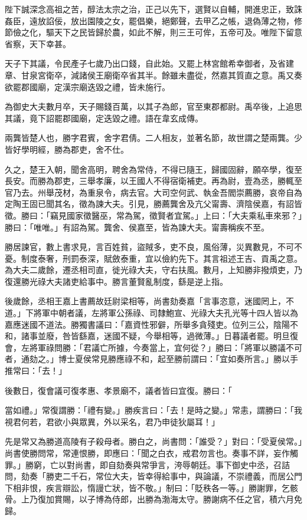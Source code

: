 \begin{pinyinscope}
陛下誠深念高祖之苦，醇法太宗之治，正己以先下，選賢以自輔，開進忠正，致誅姦臣，遠放諂佞，放出園陵之女，罷倡樂，絕鄭聲，去甲乙之帳，退偽薄之物，修節儉之化，驅天下之民皆歸於農，如此不解，則三王可侔，五帝可及。唯陛下留意省察，天下幸甚。

天子下其議，令民產子七歲乃出口錢，自此始。又罷上林宮館希幸御者，及省建章、甘泉宮衛卒，減諸侯王廟衛卒省其半。餘雖未盡從，然嘉其質直之意。禹又奏欲罷郡國廟，定漢宗廟迭毀之禮，皆未施行。

為御史大夫數月卒，天子賜錢百萬，以其子為郎，官至東郡都尉。禹卒後，上追思其議，竟下詔罷郡國廟，定迭毀之禮。語在韋玄成傳。

兩龔皆楚人也，勝字君賓，舍字君倩。二人相友，並著名節，故世謂之楚兩龔。少皆好學明經，勝為郡吏，舍不仕。

久之，楚王入朝，聞舍高明，聘舍為常侍，不得已隨王，歸國固辭，願卒學，復至長安。而勝為郡吏，三舉孝廉，以王國人不得宿衛補吏。再為尉，壹為丞，勝輒至官乃去。州舉茂材，為重泉令，病去官。大司空何武、執金吾閻崇薦勝，哀帝自為定陶王固已聞其名，徵為諫大夫。引見，勝薦龔舍及亢父甯壽、濟陰侯嘉，有詔皆徵。勝曰：「竊見國家徵醫巫，常為駕，徵賢者宜駕。」上曰：「大夫乘私車來邪？」勝曰：「唯唯。」有詔為駕。龔舍、侯嘉至，皆為諫大夫。甯壽稱疾不至。

勝居諫官，數上書求見，言百姓貧，盜賊多，吏不良，風俗薄，災異數見，不可不憂。制度泰奢，刑罰泰深，賦斂泰重，宜以儉約先下。其言祖述王吉、貢禹之意。為大夫二歲餘，遷丞相司直，徙光祿大夫，守右扶風。數月，上知勝非撥煩吏，乃復還勝光祿大夫諸吏給事中。勝言董賢亂制度，繇是逆上指。

後歲餘，丞相王嘉上書薦故廷尉梁相等，尚書劾奏嘉「言事恣意，迷國罔上，不道。」下將軍中朝者議，左將軍公孫祿、司隸鮑宣、光祿大夫孔光等十四人皆以為嘉應迷國不道法。勝獨書議曰：「嘉資性邪僻，所舉多貪殘吏。位列三公，陰陽不和，諸事並廢，咎皆繇嘉，迷國不疑，今舉相等，過微薄。」日暮議者罷。明旦復會，左將軍祿問勝：「君議亡所據，今奏當上，宜何從？」勝曰：「將軍以勝議不可者，通劾之。」博士夏侯常見勝應祿不和，起至勝前謂曰：「宜如奏所言。」勝以手推常曰：「去！」

後數日，復會議可復孝惠、孝景廟不，議者皆曰宜復。勝曰：「

當如禮。」常復謂勝：「禮有變。」勝疾言曰：「去！是時之變。」常恚，謂勝曰：「我視君何若，君欲小與眾異，外以采名，君乃申徒狄屬耳！」

先是常又為勝道高陵有子殺母者。勝白之，尚書問：「誰受？」對曰：「受夏侯常。」尚書使勝問常，常連恨勝，即應曰：「聞之白衣，戒君勿言也。奏事不詳，妄作觸罪。」勝窮，亡以對尚書，即自劾奏與常爭言，洿辱朝廷。事下御史中丞，召詰問，劾奏「勝吏二千石，常位大夫，皆幸得給事中，與論議，不崇禮義，而居公門下相非恨，疾言辯訟，惰謾亡狀，皆不敬。」制曰：「貶秩各一等。」勝謝罪，乞骸骨。上乃復加賞賜，以子博為侍郎，出勝為渤海太守。勝謝病不任之官，積六月免歸。


\end{pinyinscope}
